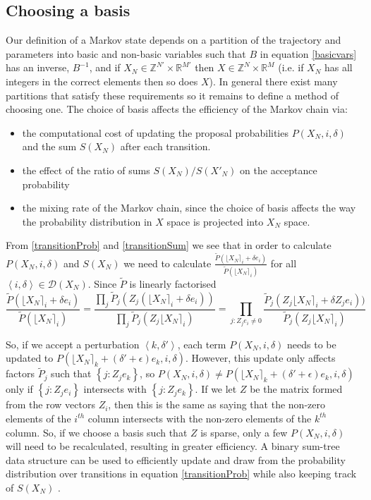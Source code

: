 \documentclass{article}
\begin{document}
\subsection{Choosing a basis}
\label{basis}
Our definition of a Markov state depends on a partition of the trajectory and parameters into basic and non-basic variables such that $B$ in equation \eqref{basicvars} has an inverse, $B^{-1}$, and if $X_N \in \mathbb{Z}^{N'} \times \mathbb{R}^{M'}$ then $X \in \mathbb{Z}^{N} \times \mathbb{R}^{M}$ (i.e. if $X_N$ has all integers in the correct elements then so does $X$). In general there exist many partitions that satisfy these requirements so it remains to define a method of choosing one. The choice of basis affects the efficiency of the Markov chain via:
\begin{itemize}
\item the computational cost of updating the proposal probabilities $P(X_N,i,\delta)$ and the sum $S(X_N)$ after each transition.

\item the effect of the ratio of sums $S(X_N)/S(X'_N)$ on the acceptance probability

\item the mixing rate of the Markov chain, since the choice of basis affects the way the probability distribution in $X$ space is projected into $X_N$ space.
\end{itemize}

From \eqref{transitionProb} and \eqref{transitionSum} we see that in order to calculate $P(X_N,i,\delta)$ and $S(X_N)$ we need to calculate $\frac{\tilde{P}(\lfloor X_N \rceil_i + \delta e_i)}{\tilde{P}(\lfloor X_N \rceil_i)}$ for all $\left<i,\delta\right> \in \mathcal{D}(X_N)$.  Since $\tilde{P}$ is linearly factorised
\[
\frac{\tilde{P}(\lfloor X_N \rceil_i + \delta e_i)}{\tilde{P}(\lfloor X_N \rceil_i)} = \frac{\prod_j \tilde{P}_j(Z_j(\lfloor X_N \rceil_i + \delta e_i))}{\prod_j \tilde{P}_j(Z_j\lfloor X_N \rceil_i)} = \prod_{j : Z_je_i \ne 0} \frac{\tilde{P}_j(Z_j \lfloor X_N \rceil_i + \delta Z_j e_i))}{\tilde{P}_j(Z_j \lfloor X_N \rceil_i)}
\]

So, if we accept a perturbation $\left<k,\delta'\right>$, each term $P(X_N,i,\delta)$ needs to be updated 
to $P(\lfloor X_N \rceil_k + (\delta'+\epsilon)e_k, i, \delta)$. However, this update only affects factors $\tilde{P}_j$ such that  $\left\{j : Z_j e_k\right\}$, so $P(X_N,i,\delta) \ne P(\lfloor X_N \rceil_k + (\delta'+\epsilon)e_k, i, \delta)$ only if $\left\{j : Z_je_i\right\}$ intersects with $\left\{j : Z_je_k\right\}$.
If we let $Z$ be the matrix formed from the row vectors $Z_i$, then this is the same as saying that the non-zero elements of the $i^{th}$ column intersects with the non-zero elements of the $k^{th}$ column. So, if we choose a basis such that $Z$ is sparse, only a few $P(X_N,i,\delta)$ will need to be recalculated, resulting in greater efficiency. A binary sum-tree data structure can be used to efficiently update and draw from the probability distribution over transitions in equation \eqref{transitionProb} while also keeping track of $S(X_N)$ \citep{TangMutableCategorical}.
 
\end{document}
